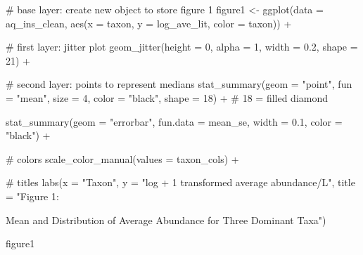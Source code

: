 \documentclass[
  letterpaper,
  DIV=11,
  numbers=noendperiod]{scrartcl}
\newenvironment{Shaded}{\begin{snugshade}}{\end{snugshade}}
\newcommand{\AttributeTok}[1]{\textcolor[rgb]{0.40,0.45,0.13}{#1}}
\newcommand{\CommentTok}[1]{\textcolor[rgb]{0.37,0.37,0.37}{#1}}
\newcommand{\DecValTok}[1]{\textcolor[rgb]{0.68,0.00,0.00}{#1}}
\newcommand{\FloatTok}[1]{\textcolor[rgb]{0.68,0.00,0.00}{#1}}
\newcommand{\FunctionTok}[1]{\textcolor[rgb]{0.28,0.35,0.67}{#1}}
\newcommand{\NormalTok}[1]{\textcolor[rgb]{0.00,0.23,0.31}{#1}}
\newcommand{\OtherTok}[1]{\textcolor[rgb]{0.00,0.23,0.31}{#1}}
\newcommand{\SpecialCharTok}[1]{\textcolor[rgb]{0.37,0.37,0.37}{#1}}
\newcommand{\StringTok}[1]{\textcolor[rgb]{0.13,0.47,0.30}{#1}}
\begin{document}
\begin{Shaded}
\begin{Highlighting}[]
\CommentTok{\# base layer: create new object to store figure 1}
\NormalTok{figure1 }\OtherTok{\textless{}{-}} \FunctionTok{ggplot}\NormalTok{(}\AttributeTok{data =}\NormalTok{ aq\_ins\_clean,}
                 \FunctionTok{aes}\NormalTok{(}\AttributeTok{x =}\NormalTok{ taxon,}
                     \AttributeTok{y =}\NormalTok{ log\_ave\_lit,}
                     \AttributeTok{color =}\NormalTok{ taxon)) }\SpecialCharTok{+}
  
  \CommentTok{\# first layer: jitter plot}
  \FunctionTok{geom\_jitter}\NormalTok{(}\AttributeTok{height =} \DecValTok{0}\NormalTok{,}
              \AttributeTok{alpha =} \DecValTok{1}\NormalTok{,}
              \AttributeTok{width =} \FloatTok{0.2}\NormalTok{,}
              \AttributeTok{shape =} \DecValTok{21}\NormalTok{) }\SpecialCharTok{+}
  
  \CommentTok{\# second layer: points to represent medians}
  \FunctionTok{stat\_summary}\NormalTok{(}\AttributeTok{geom =} \StringTok{"point"}\NormalTok{,}
               \AttributeTok{fun =} \StringTok{"mean"}\NormalTok{,}
               \AttributeTok{size =} \DecValTok{4}\NormalTok{,}
               \AttributeTok{color =} \StringTok{"black"}\NormalTok{,}
               \AttributeTok{shape =} \DecValTok{18}\NormalTok{) }\SpecialCharTok{+} \CommentTok{\# 18 = filled diamond }
  
   \FunctionTok{stat\_summary}\NormalTok{(}\AttributeTok{geom =} \StringTok{"errorbar"}\NormalTok{,}
               \AttributeTok{fun.data =}\NormalTok{ mean\_se,}
               \AttributeTok{width =} \FloatTok{0.1}\NormalTok{,}
               \AttributeTok{color =} \StringTok{"black"}\NormalTok{) }\SpecialCharTok{+}
  
  \CommentTok{\# colors }
  \FunctionTok{scale\_color\_manual}\NormalTok{(}\AttributeTok{values =}\NormalTok{ taxon\_cols) }\SpecialCharTok{+}
  
  \CommentTok{\# titles}
  \FunctionTok{labs}\NormalTok{(}\AttributeTok{x =} \StringTok{"Taxon"}\NormalTok{,}
       \AttributeTok{y =} \StringTok{"log + 1 transformed average abundance/L"}\NormalTok{,}
       \AttributeTok{title =} \StringTok{"Figure 1:}

\StringTok{Mean and Distribution of Average Abundance for Three Dominant Taxa"}\NormalTok{)}

\NormalTok{figure1}
\end{Highlighting}
\end{Shaded}
\end{document}

